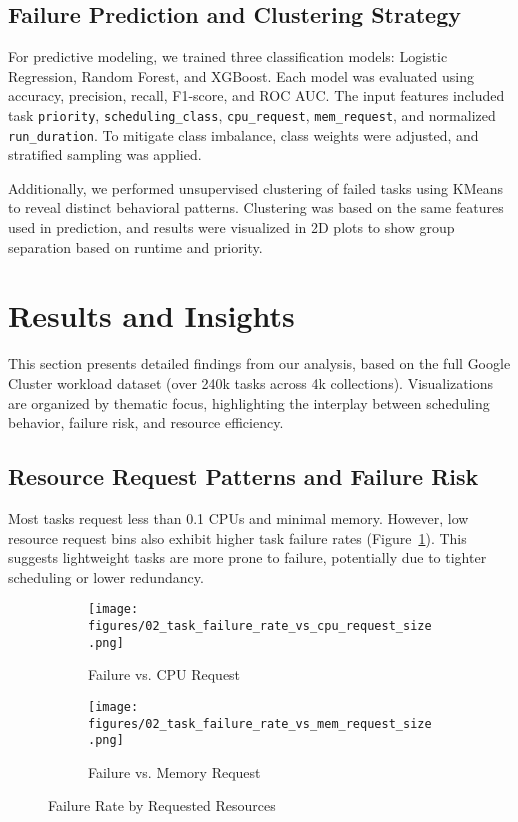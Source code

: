 \documentclass[a4paper,12pt]{article}
\begin{document}
\subsection{Failure Prediction and Clustering Strategy}

For predictive modeling, we trained three classification models: Logistic Regression, Random Forest, and XGBoost. Each model was evaluated using accuracy, precision, recall, F1-score, and ROC AUC. The input features included task \texttt{priority}, \texttt{scheduling\_class}, \texttt{cpu\_request}, \texttt{mem\_request}, and normalized \texttt{run\_duration}. To mitigate class imbalance, class weights were adjusted, and stratified sampling was applied.

Additionally, we performed unsupervised clustering of failed tasks using KMeans to reveal distinct behavioral patterns. Clustering was based on the same features used in prediction, and results were visualized in 2D plots to show group separation based on runtime and priority.

\section{Results and Insights}

This section presents detailed findings from our analysis, based on the full Google Cluster workload dataset (over 240k tasks across 4k collections). Visualizations are organized by thematic focus, highlighting the interplay between scheduling behavior, failure risk, and resource efficiency.

\subsection{Resource Request Patterns and Failure Risk}

Most tasks request less than 0.1 CPUs and minimal memory. However, low resource request bins also exhibit higher task failure rates (Figure~\ref{fig:fail-vs-request}). This suggests lightweight tasks are more prone to failure, potentially due to tighter scheduling or lower redundancy.

\begin{figure}[htbp]
  \centering
  \begin{subfigure}[b]{0.48\linewidth}
    \texttt{[image: figures/02\_task\_failure\_rate\_vs\_cpu\_request\_size.png]}
    \caption{Failure vs. CPU Request}
  \end{subfigure}
  \hfill
  \begin{subfigure}[b]{0.48\linewidth}
    \texttt{[image: figures/02\_task\_failure\_rate\_vs\_mem\_request\_size.png]}
    \caption{Failure vs. Memory Request}
  \end{subfigure}
  \caption{Failure Rate by Requested Resources}
  \label{fig:fail-vs-request}
\end{figure}
\end{document}
